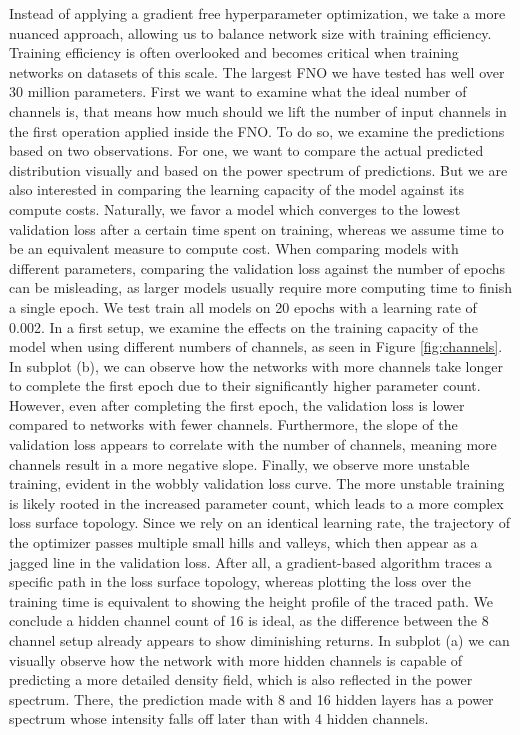 \documentclass{article}
\begin{document}
Instead of applying a gradient free hyperparameter optimization, we take a more nuanced approach, allowing us to balance network size with training efficiency. Training efficiency is often overlooked and becomes critical when training networks on datasets of this scale. The largest FNO we have tested has well over 30 million parameters. First we want to examine what the ideal number of channels is, that means how much should we lift the number of input channels in the first operation applied inside the FNO. To do so, we examine the predictions based on two observations. For one, we want to compare the actual predicted distribution visually and based on the power spectrum of predictions. But we are also interested in comparing the learning capacity of the model against its compute costs. Naturally, we favor a model which converges to the lowest validation loss after a certain time spent on training, whereas we assume time to be an equivalent measure to compute cost. When comparing models with different parameters, comparing the validation loss against the number of epochs can be misleading, as larger models usually require more computing time to finish a single epoch. We test train all models on 20 epochs with a learning rate of 0.002. In a first setup, we examine the effects on the training capacity of the model when using different numbers of channels, as seen in Figure \ref{fig:channels}. In subplot (b), we can observe how the networks with more channels take longer to complete the first epoch due to their significantly higher parameter count. However, even after completing the first epoch, the validation loss is lower compared to networks with fewer channels. Furthermore, the slope of the validation loss appears to correlate with the number of channels, meaning more channels result in a more negative slope. Finally, we observe more unstable training, evident in the wobbly validation loss curve. The more unstable training is likely rooted in the increased parameter count, which leads to a more complex loss surface topology. Since we rely on an identical learning rate, the trajectory of the optimizer passes multiple small hills and valleys, which then appear as a jagged line in the validation loss. After all, a gradient-based algorithm traces a specific path in the loss surface topology, whereas plotting the loss over the training time is equivalent to showing the height profile of the traced path. We conclude a hidden channel count of 16 is ideal, as the difference between the 8 channel setup already appears to show diminishing returns. In subplot (a) we can visually observe how the network with more hidden channels is capable of predicting a more detailed density field, which is also reflected in the power spectrum. There, the prediction made with 8 and 16 hidden layers has a power spectrum whose intensity falls off later than with 4 hidden channels.
\end{document}
